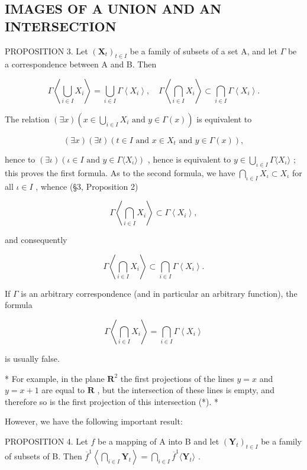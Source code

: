 \subsection{IMAGES OF A UNION AND AN INTERSECTION}

PROPOSITION 3. Let \((\mathbf{X}_t)_{t\in I}\) be a family of subsets of a set A, and let \(\Gamma\) be a correspondence between A and B. Then

\[
\Gamma \left\langle \bigcup_ {i \in I} X _ {i} \right\rangle = \bigcup_ {i \in I} \Gamma \left\langle X _ {i} \right\rangle , \quad \Gamma \left\langle \bigcap_ {i \in I} X _ {i} \right\rangle \subset \bigcap_ {i \in I} \Gamma \left\langle X _ {i} \right\rangle .
\]

The relation \((\exists x)\left(x\in \bigcup_{i\in I}X_i \text{ and } y\in \Gamma (x)\right)\) is equivalent to

\[
(\exists x) (\exists t) (t \in I \text {   and   } x \in X _ {t} \text {   and   } y \in \Gamma (x)),
\]

hence to \((\exists \iota)(\iota \in I \text{ and } y \in \Gamma\langle X_{\iota}\rangle)\) , hence is equivalent to \(y \in \bigcup_{\iota \in I} \Gamma\langle X_{\iota}\rangle\) ; this proves the first formula. As to the second formula, we have \(\bigcap_{\iota \in I} X_{\iota} \subset X_{\iota}\) for all \(\iota \in I\) , whence (§3, Proposition 2)

\[
\Gamma \left\langle \bigcap_ {i \in I} X _ {i} \right\rangle \subset \Gamma \left\langle X _ {i} \right\rangle ,
\]

and consequently

\[
\Gamma \left\langle \bigcap_ {i \in I} X _ {i} \right\rangle \subset \bigcap_ {i \in I} \Gamma \left\langle X _ {i} \right\rangle .
\]

If \(\Gamma\) is an arbitrary correspondence (and in particular an arbitrary function), the formula

\[
\Gamma \left\langle \bigcap_ {i \in I} X _ {i} \right\rangle = \bigcap_ {i \in I} \Gamma \left\langle X _ {i} \right\rangle
\]

is usually false.

* For example, in the plane \(\mathbf{R}^2\) the first projections of the lines \(y = x\) and \(y = x + 1\) are equal to \(\mathbf{R}\) , but the intersection of these lines is empty, and therefore so is the first projection of this intersection (*). *

However, we have the following important result:

PROPOSITION 4. Let \(f\) be a mapping of A into B and let \((\mathbf{Y}_t)_{t \in I}\) be a family of subsets of B. Then \(\overline{f}^1 \left\langle \bigcap_{i \in I} \mathbf{Y}_t \right\rangle = \bigcap_{i \in I} \overline{f}^1 \langle \mathbf{Y}_t \rangle\) .

